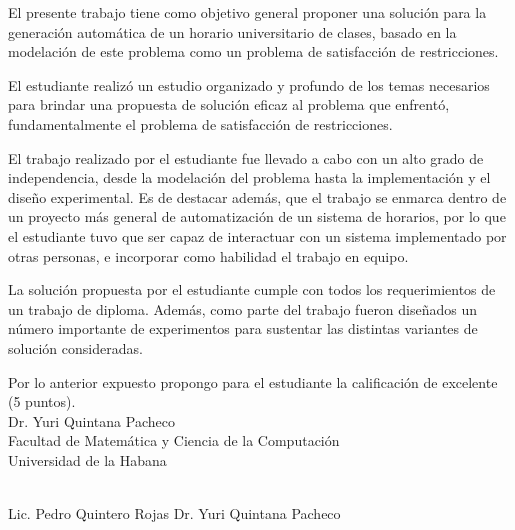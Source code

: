 \begin{opinion}

El presente trabajo tiene como objetivo general proponer una solución para la generación automática de un horario universitario de clases, basado en la modelación de este problema como un problema de satisfacción de restricciones.

El estudiante realizó un estudio organizado y profundo de los temas necesarios para brindar una propuesta de solución eficaz al problema que enfrentó, fundamentalmente el problema de satisfacción de restricciones.

El trabajo realizado por el estudiante fue llevado a cabo con un alto grado de independencia, desde la modelación del problema hasta la implementación y el diseño experimental. Es de destacar además, que el trabajo se enmarca dentro de un proyecto más general de automatización de un sistema de horarios, por lo que el estudiante tuvo que ser capaz de interactuar con un sistema implementado por otras personas, e incorporar como habilidad el trabajo en equipo.

La solución propuesta por el estudiante cumple con todos los requerimientos de un trabajo de diploma. Además, como parte del trabajo fueron diseñados un número importante de experimentos para sustentar las distintas variantes de solución consideradas.

Por lo anterior expuesto propongo para el estudiante la calificación de excelente (5 puntos).\\

\noindent Dr. Yuri Quintana Pacheco\\
Facultad de Matemática y Ciencia de la Computación\\
Universidad de la Habana

\vfill
\begin{flushleft}
\underline{\hspace{140pt}}\hfill \underline{\hspace{140pt}}\\
Lic. Pedro Quintero Rojas \hfill Dr. Yuri Quintana Pacheco \hspace*{7pt}
\end{flushleft}
\end{opinion}